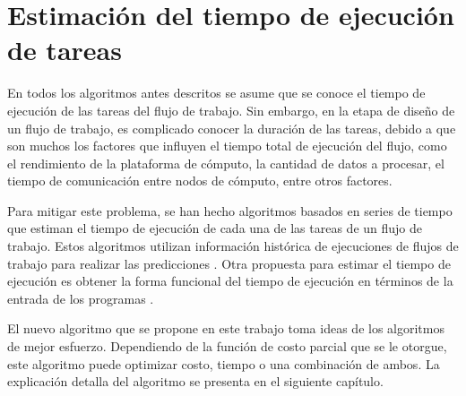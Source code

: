 	
\section{Estimación del tiempo de ejecuci\'on de tareas}

En todos los algoritmos antes descritos se asume que se conoce el tiempo de ejecución de las tareas del flujo de trabajo. Sin embargo, en la etapa de diseño de un flujo de trabajo, es complicado conocer la duración de las tareas, debido a que son muchos los factores que influyen el tiempo total de ejecución del flujo, como el rendimiento de la plataforma de cómputo, la cantidad de datos a procesar, el tiempo de comunicación entre nodos de cómputo, entre otros factores. 

Para mitigar este problema, se han hecho algoritmos basados en series de tiempo que estiman el tiempo de ejecución de cada una de las tareas de un flujo de trabajo. Estos algoritmos utilizan información histórica de ejecuciones de flujos de trabajo para realizar las predicciones  \cite{liu2011novel}. Otra propuesta para estimar el tiempo de ejecuci\'on es obtener la forma funcional del tiempo de ejecuci\'on en t\'erminos de la entrada de los programas \cite{coppa2012input}.

El nuevo algoritmo que se propone en este trabajo toma ideas de los algoritmos de mejor esfuerzo.  Dependiendo de la funci\'on de costo parcial que se le otorgue, este algoritmo puede optimizar costo, tiempo o una combinaci\'on de ambos. La explicaci\'on detalla del algoritmo se presenta en el siguiente cap\'itulo.
